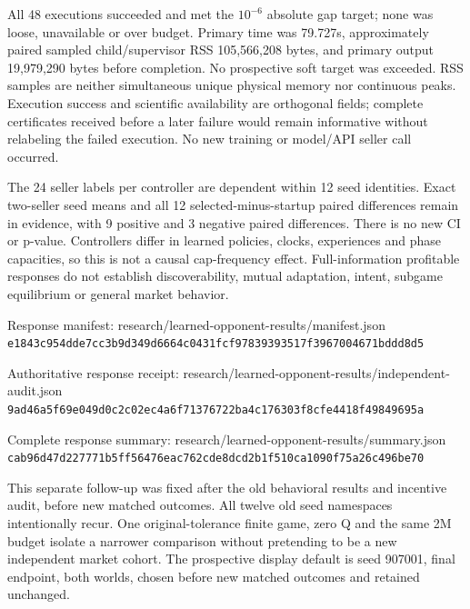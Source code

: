 \documentclass[a4paper,10pt]{article}
\newcommand{\reportheading}[1]{\par\vspace{5pt}{\large\bfseries\color{ink}#1}\par\vspace{2pt}}
\begin{document}
All 48 executions succeeded and met the $10^{-6}$ absolute gap target; none was loose, unavailable or over budget. Primary time was 79.727s, approximately paired sampled child/supervisor RSS 105,566,208 bytes, and primary output 19,979,290 bytes before completion. No prospective soft target was exceeded. RSS samples are neither simultaneous unique physical memory nor continuous peaks. Execution success and scientific availability are orthogonal fields; complete certificates received before a later failure would remain informative without relabeling the failed execution. No new training or model/API seller call occurred.
\par

The 24 seller labels per controller are dependent within 12 seed identities. Exact two-seller seed means and all 12 selected-minus-startup paired differences remain in evidence, with 9 positive and 3 negative paired differences. There is no new CI or p-value. Controllers differ in learned policies, clocks, experiences and phase capacities, so this is not a causal cap-frequency effect. Full-information profitable responses do not establish discoverability, mutual adaptation, intent, subgame equilibrium or general market behavior.
\par

{\fontsize{7.7}{9.5}\selectfont Response manifest: research/learned-opponent-results/manifest.json\\\nolinkurl{e1843c954dde7cc3b9d349d6664c0431fcf97839393517f3967004671bddd8d5}\par}

{\fontsize{7.7}{9.5}\selectfont Authoritative response receipt: research/learned-opponent-results/independent-audit.json\\\nolinkurl{9ad46a5f69e049d0c2c02ec4a6f71376722ba4c176303f8cfe4418f49849695a}\par}

{\fontsize{7.7}{9.5}\selectfont Complete response summary: research/learned-opponent-results/summary.json\\\nolinkurl{cab96d47d227771b5ff56476eac762cde8dcd2b1f510ca1090f75a26c496be70}\par}

\clearpage


\reportheading{Appendix: Equal clock labels and dense allocation}

This separate follow-up was fixed after the old behavioral results and incentive audit, before new matched outcomes. All twelve old seed namespaces intentionally recur. One original-tolerance finite game, zero Q and the same 2M budget isolate a narrower comparison without pretending to be a new independent market cohort. The prospective display default is seed 907001, final endpoint, both worlds, chosen before new matched outcomes and retained unchanged.
\par
\end{document}
